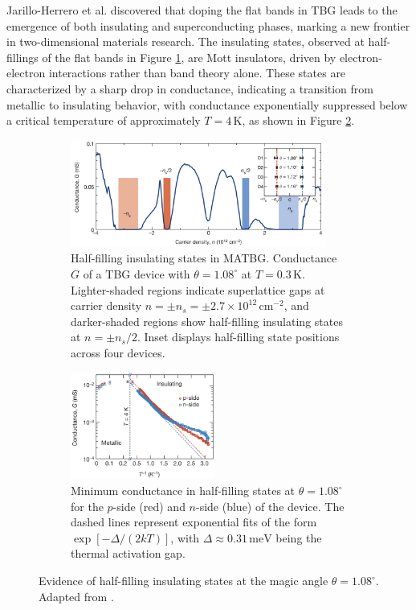 Jarillo-Herrero et al. \cite{cao2018, cao2018_correlated} discovered that doping the flat bands in TBG leads to the emergence of both insulating and superconducting phases, marking a new frontier in two-dimensional materials research. The insulating states, observed at half-fillings of the flat bands in Figure \ref{fig:tbg_conductance_filling_insulating}, are Mott insulators, driven by electron-electron interactions rather than band theory alone. These states are characterized by a sharp drop in conductance, indicating a transition from metallic to insulating behavior, with conductance exponentially suppressed below a critical temperature of approximately \(T = 4 \, \text{K}\), as shown in Figure \ref{fig:tbg_conductance_temperature_insulating}.

\begin{figure}[H]
\centering
\begin{subfigure}{.56\textwidth}
  \centering
  \includegraphics[height=9.5em]{fig/tbg_conductance_filling_insulating.png}
  \caption{Half-filling insulating states in MATBG. Conductance \(G\) of a TBG device with \(\theta = 1.08^\circ\) at \(T = 0.3 \, \text{K}\). Lighter-shaded regions indicate superlattice gaps at carrier density \(n = \pm n_s = \pm 2.7 \times 10^{12} \, \text{cm}^{-2}\), and darker-shaded regions show half-filling insulating states at \(n = \pm n_s/2\). Inset displays half-filling state positions across four devices.}
  \label{fig:tbg_conductance_filling_insulating}
\end{subfigure} \hfill
\begin{subfigure}{.40\textwidth}
  \centering
  \includegraphics[height=9.5em]{fig/tbg_conductance_temperature_insulating.png}
  \caption{Minimum conductance in half-filling states at $\theta = 1.08^\circ$ for the \(p\)-side (red) and \(n\)-side (blue) of the device. The dashed lines represent exponential fits of the form \(\exp[-\Delta/(2kT)]\), with \(\Delta \approx 0.31 \, \text{meV}\) being the thermal activation gap.}
  \label{fig:tbg_conductance_temperature_insulating}
\end{subfigure}
\caption{Evidence of half-filling insulating states at the magic angle \(\theta = 1.08^\circ\). Adapted from \cite{cao2018_correlated}.}
\label{fig:tbg_insulating}
\end{figure}


